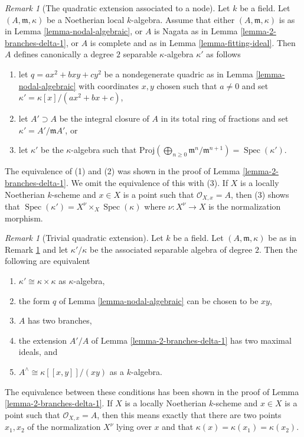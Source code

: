 \documentclass{stacks-project}
\theoremstyle{plain}
\theoremstyle{definition}
\theoremstyle{remark}
\newtheorem{remark}[subsection]{Remark}
\numberwithin{equation}{subsection}
\def\Spec{\mathop{\mathrm{Spec}}}
\begin{document}
\begin{remark}[The quadratic extension associated to a node]
\label{remark-quadratic-extension}
Let $k$ be a field. Let $(A, \mathfrak m, \kappa)$ be a
Noetherian local $k$-algebra. Assume that either
$(A, \mathfrak m, \kappa)$ is as in Lemma \ref{lemma-nodal-algebraic}, or
$A$ is Nagata as in Lemma \ref{lemma-2-branches-delta-1}, or
$A$ is complete and as in Lemma \ref{lemma-fitting-ideal}.
Then $A$ defines canonically a degree $2$ separable $\kappa$-algebra
$\kappa'$ as follows
\begin{enumerate}
\item let $q = ax^2 + bxy + cy^2$ be a nondegenerate quadric
as in Lemma \ref{lemma-nodal-algebraic} with coordinates $x, y$ chosen
such that $a \not = 0$ and set
$\kappa' = \kappa[x]/(ax^2 + bx + c)$,
\item let $A' \supset A$ be the integral closure of $A$ in its
total ring of fractions and set $\kappa' = A'/\mathfrak m A'$, or
\item let $\kappa'$ be the $\kappa$-algebra such that
$\text{Proj}(\bigoplus_{n \geq 0} \mathfrak m^n/\mathfrak m^{n + 1}) =
\Spec(\kappa')$.
\end{enumerate}
The equivalence of (1) and (2) was shown in the proof of
Lemma \ref{lemma-2-branches-delta-1}. We omit the equivalence of
this with (3). If $X$ is a locally Noetherian $k$-scheme and $x \in X$
is a point such that $\mathcal{O}_{X, x} = A$, then (3) shows that
$\Spec(\kappa') = X^\nu \times_X \Spec(\kappa)$ where $\nu : X^\nu \to X$
is the normalization morphism.
\end{remark}

\begin{remark}[Trivial quadratic extension]
\label{remark-trivial-quadratic-extension}
Let $k$ be a field. Let $(A, \mathfrak m, \kappa)$ be as in
Remark \ref{remark-quadratic-extension} and let $\kappa'/\kappa$
be the associated separable algebra of degree $2$.
Then the following are equivalent
\begin{enumerate}
\item $\kappa' \cong \kappa \times \kappa$ as $\kappa$-algebra,
\item the form $q$ of Lemma \ref{lemma-nodal-algebraic}
can be chosen to be $xy$,
\item $A$ has two branches,
\item the extension $A'/A$ of Lemma \ref{lemma-2-branches-delta-1}
has two maximal ideals, and
\item $A^\wedge \cong \kappa[[x, y]]/(xy)$ as a $k$-algebra.
\end{enumerate}
The equivalence between these conditions has been shown in the
proof of Lemma \ref{lemma-2-branches-delta-1}. If $X$ is a
locally Noetherian $k$-scheme and $x \in X$ is a point such that
$\mathcal{O}_{X, x} = A$, then this means exactly that
there are two points $x_1, x_2$ of the normalization $X^\nu$
lying over $x$ and that $\kappa(x) = \kappa(x_1) = \kappa(x_2)$.
\end{remark}
\end{document}
